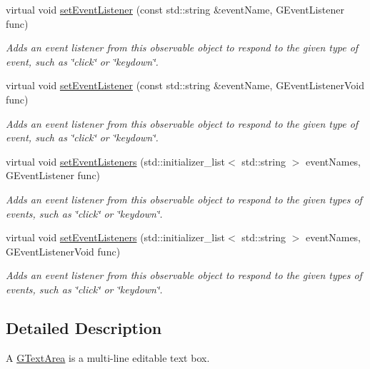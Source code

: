 \begin{DoxyCompactItemize}
virtual void \mbox{\hyperlink{classGObservable_ad2f6d34961c50f6c1e0659990b79f741}{set\+Event\+Listener}} (const std\+::string \&event\+Name, G\+Event\+Listener func)
\begin{DoxyCompactList}\small\item\em Adds an event listener from this observable object to respond to the given type of event, such as \char`\"{}click\char`\"{} or \char`\"{}keydown\char`\"{}. \end{DoxyCompactList}\item 
virtual void \mbox{\hyperlink{classGObservable_abac4cb9f9e626e010e87f5d91573c8a5}{set\+Event\+Listener}} (const std\+::string \&event\+Name, G\+Event\+Listener\+Void func)
\begin{DoxyCompactList}\small\item\em Adds an event listener from this observable object to respond to the given type of event, such as \char`\"{}click\char`\"{} or \char`\"{}keydown\char`\"{}. \end{DoxyCompactList}\item 
virtual void \mbox{\hyperlink{classGObservable_afa388d69c33c718cf035774604065604}{set\+Event\+Listeners}} (std\+::initializer\+\_\+list$<$ std\+::string $>$ event\+Names, G\+Event\+Listener func)
\begin{DoxyCompactList}\small\item\em Adds an event listener from this observable object to respond to the given types of events, such as \char`\"{}click\char`\"{} or \char`\"{}keydown\char`\"{}. \end{DoxyCompactList}\item 
virtual void \mbox{\hyperlink{classGObservable_a7867184bbb686f74fae8a4db927da799}{set\+Event\+Listeners}} (std\+::initializer\+\_\+list$<$ std\+::string $>$ event\+Names, G\+Event\+Listener\+Void func)
\begin{DoxyCompactList}\small\item\em Adds an event listener from this observable object to respond to the given types of events, such as \char`\"{}click\char`\"{} or \char`\"{}keydown\char`\"{}. \end{DoxyCompactList}\end{DoxyCompactItemize}


\subsection{Detailed Description}
A \mbox{\hyperlink{classGTextArea}{G\+Text\+Area}} is a multi-\/line editable text box. 

